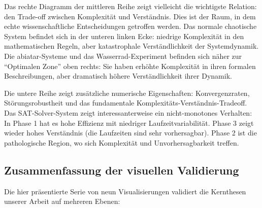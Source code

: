 \documentclass[a4paper,12pt]{article}
\theoremstyle{definition}
\begin{document}
Das rechte Diagramm der mittleren Reihe zeigt vielleicht die wichtigste Relation: den Trade-off zwischen Komplexität und Verständnis. Dies ist der Raum, in dem echte wissenschaftliche Entscheidungen getroffen werden. Das normale chaotische System befindet sich in der unteren linken Ecke: niedrige Komplexität in den mathematischen Regeln, aber katastrophale Verständlichkeit der Systemdynamik. Die abiatar-Systeme und das Wasserrad-Experiment befinden sich näher zur ``Optimalen Zone'' oben rechts: Sie haben erhöhte Komplexität in ihren formalen Beschreibungen, aber dramatisch höhere Verständlichkeit ihrer Dynamik.

Die untere Reihe zeigt zusätzliche numerische Eigenschaften: Konvergenzraten, Störungsrobustheit und das fundamentale Komplexitäts-Verständnis-Tradeoff. Das SAT-Solver-System zeigt interessanterweise ein nicht-monotones Verhalten: In Phase 1 hat es hohe Effizienz mit niedriger Laufzeitvariabilität. Phase 3 zeigt wieder hohes Verständnis (die Laufzeiten sind sehr vorhersagbar). Phase 2 ist die pathologische Region, wo sich Komplexität und Unvorhersagbarkeit treffen.

\subsection{Zusammenfassung der visuellen Validierung}

Die hier präsentierte Serie von neun Visualisierungen validiert die Kernthesen unserer Arbeit auf mehreren Ebenen:
\end{document}
